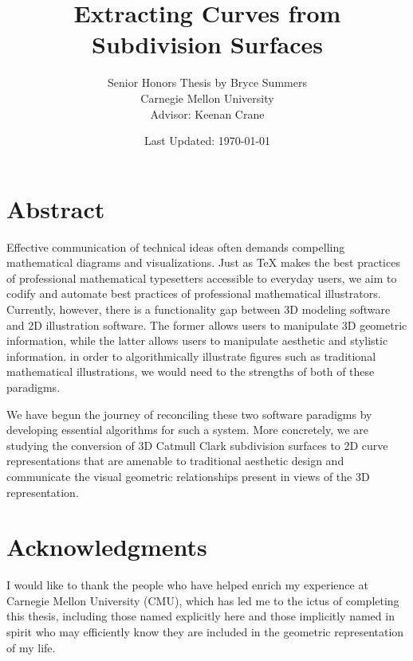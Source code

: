 \documentclass[12pt, letterpaper]{article}
\begin{document}
\doublespacing

\title{\color{blue}Extracting Curves from Subdivision Surfaces}
\author{Senior Honors Thesis by Bryce Summers \\
Carnegie Mellon University\\
Advisor: Keenan Crane}
\date{\color{red}Last Updated: \today}
\maketitle



\newpage

\section*{Abstract}

	Effective communication of technical ideas often demands compelling mathematical diagrams and visualizations. 
	Just as TeX makes the best practices of professional mathematical typesetters accessible to everyday users,
	we aim to codify and automate best practices of professional mathematical illustrators.
	Currently, however, there is a functionality gap between 3D modeling software and 2D illustration software.
	The former allows users to manipulate 3D geometric information, while the latter allows users to manipulate aesthetic and stylistic information.
	in order to algorithmically illustrate figures such as traditional mathematical illustrations, we would need to the strengths of both of these paradigms.

	We have begun the journey of reconciling these two software paradigms by developing essential algorithms for such a system. 
	More concretely, we are studying the conversion of 3D Catmull Clark subdivision surfaces to 2D curve representations that are amenable to
	traditional aesthetic design and communicate the visual geometric relationships present in views of the 3D representation.

\newpage

\section*{Acknowledgments}
\singlespacing

I would like to thank the people who have helped enrich my experience at Carnegie Mellon University (CMU),
which has led me to the ictus of completing this thesis, including those named explicitly here  and
those implicitly named in spirit who may efficiently know they are included in the geometric representation of my life.
\end{document}

